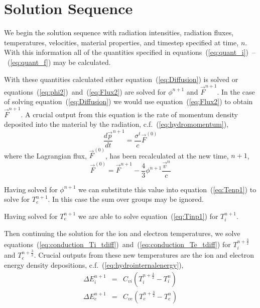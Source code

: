 \documentclass{article}
\begin{document}
\section{Solution Sequence}

We begin the solution sequence with radiation intensities,
radiation fluxes, temperatures, velocities,
material properties, and timestep specified at time, $n$.
With this information all of the quantities specified in
equations~(\ref{eq:quant_i})~--~(\ref{eq:quant_f}) may be calculated.

With these quantities calculated either equation~(\ref{eq:Diffusion}) is
solved or equations~(\ref{eq:phi2})~and~(\ref{eq:Flux2}) are solved for
$\phi^{n+1}$ and $\vec{F}^{n+1}$.
In the case of solving equation~(\ref{eq:Diffusion}) we would use
equation~(\ref{eq:Flux2}) to obtain $\vec{F}^{n+1}$.
A crucial output from this equation is the rate of momentum density
deposited into the material by the radiation,
c.f.~(\ref{eq:hydromomentum}),
\begin{equation}
   {\frac{d\vec{p}}{dt}}^{n+1} = \frac{\sigma^{t}}{c} \vec{F}^{(0)}
\end{equation}
where the Lagrangian flux, $\vec{F}^{(0)}$, has been recalculated at the
new time, $n+1$,
\begin{equation}
   \vec{F}^{(0)} = \vec{F}^{n+1} - \frac{4}{3} \phi^{n+1}
                                                \frac{\vec{v}^{n}}{c}
\end{equation}

Having solved for $\phi^{n+1}$ we can substitute this
value into equation~(\ref{eq:Tenp1}) to solve for $T_{e}^{n+1}$.
In this case the sum over groups may be ignored.

Having solved
for $T_{e}^{n+1}$ we are able to
solve equation~(\ref{eq:Tinp1}) for $T_{i}^{n+1}$.

Then continuing the solution for the ion and electron temperatures, we solve
equations~(\ref{eq:conduction_Ti_tdiff})~and~(\ref{eq:conduction_Te_tdiff})
for $T_{i}^{n+\frac{3}{2}}$ and $T_{e}^{n+\frac{3}{2}}$.
Crucial outputs from these new temperatures are the ion and electron
energy density depositions,
c.f.~(\ref{eq:hydrointernalenergy}),
\begin{eqnarray}
        \Delta E_{i}^{n+1} &=& C_{vi} ( T_{i}^{n+\frac{3}{2}} - T_{i}^{n})
  \\
        \Delta E_{e}^{n+1} &=& C_{ve} ( T_{e}^{n+\frac{3}{2}} - T_{e}^{n})
\end{eqnarray}

\appendix
\end{document}
